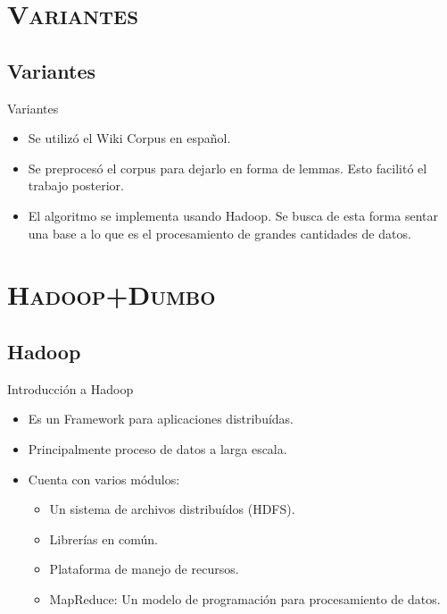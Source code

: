 \documentclass[xcolor=x11names,compress]{beamer}
\renewcommand{\(}{\begin{columns}}
\renewcommand{\)}{\end{columns}}
\newcommand{\<}[1]{\begin{column}{#1}}
\renewcommand{\>}{\end{column}}
\begin{document}
\section{\scshape Variantes}
\subsection{Variantes}
\begin{frame}{Variantes}
\begin{itemize}
\item Se utilizó el Wiki Corpus en español.
\item Se preprocesó el corpus para dejarlo en forma de lemmas. Esto facilitó el trabajo posterior.
\item El algoritmo se implementa usando Hadoop. Se busca de esta forma sentar una base a lo que es el procesamiento de grandes cantidades de datos.
\end{itemize}
\end{frame}


\section{\scshape Hadoop+Dumbo}
\subsection{Hadoop}
\begin{frame}{Introducción a Hadoop}
\begin{itemize}
\item Es un Framework para aplicaciones distribuídas.
\item Principalmente proceso de datos a larga escala.
\item Cuenta con varios módulos:
\begin{itemize}
\item Un sistema de archivos distribuídos (HDFS).
\item Librerías en común.
\item Plataforma de manejo de recursos.
\item MapReduce: Un modelo de programación para procesamiento de datos.
\end{itemize}
\end{itemize}
\end{frame}
\end{document}
